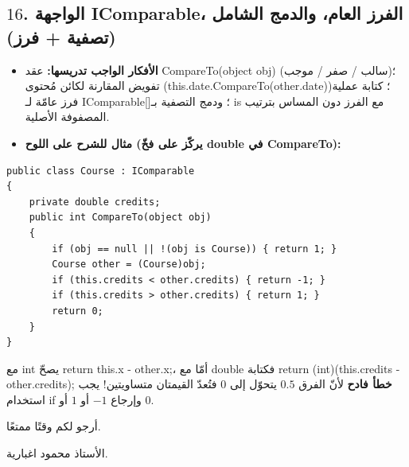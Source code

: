 \documentclass[14pt]{extarticle}
\begin{document}
\filbreak
\subsection*{$16$. الواجهة \textenglish{IComparable}، الفرز العام، والدمج الشامل (تصفية + فرز)}
\begin{itemize}[itemsep=0.25em]
    \item \textbf{الأفكار الواجب تدريسها:} عقد \textenglish{CompareTo(object obj)} (سالب / صفر / موجب)؛ تفويض المقارنة لكائن مُحتوى (\textenglish{this.date.CompareTo(other.date)})؛ كتابة عملية فرز عامّة لـ \textenglish{IComparable[]}؛ ودمج التصفية بـ \textenglish{is} مع الفرز دون المساس بترتيب المصفوفة الأصلية.
    \item \textbf{مثال للشرح على اللوح (يركّز على فخّ \textenglish{double} في \textenglish{CompareTo}):}
\end{itemize}
\begin{boxCode}
\begin{english}
\begin{verbatim}
public class Course : IComparable
{
    private double credits;
    public int CompareTo(object obj)
    {
        if (obj == null || !(obj is Course)) { return 1; }
        Course other = (Course)obj;
        if (this.credits < other.credits) { return -1; }
        if (this.credits > other.credits) { return 1; }
        return 0;
    }
}
\end{verbatim}
\end{english}
\end{boxCode}
\begin{boxWarning}
مع \textenglish{int} يصحّ \textenglish{return this.x - other.x;}، أمّا مع \textenglish{double} فكتابة \textenglish{return (int)(this.credits - other.credits);} \textbf{خطأ فادح} لأنّ الفرق $0.5$ يتحوّل إلى $0$ فتُعدّ القيمتان متساويتين! يجب استخدام \textenglish{if} وإرجاع $-1$ أو $1$ أو $0$.
\end{boxWarning}

\vspace{0.8cm}
\begin{flushleft}
أرجو لكم وقتًا ممتعًا.

الأستاذ محمود اغبارية.
\end{flushleft}
\end{document}
